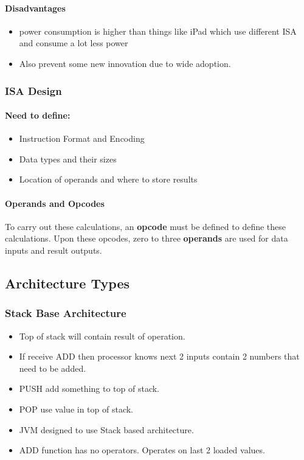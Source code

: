 \documentclass{article}
\newcommand\tab[1][0.5cm]{\hspace*{#1}}
\begin{document}
			\paragraph{\tab Disadvantages}
				\begin{itemize}
					\item power consumption is higher than things like iPad which use different ISA and consume a lot less power
					\item Also prevent some new innovation due to wide adoption.
				\end{itemize}


		\subsubsection*{ISA Design}
			\paragraph{\tab Need to define:}
			\begin{itemize}
				\item Instruction Format and Encoding
				\item Data types and their sizes
				\item Location of operands and where to store results
			\end{itemize}

		\paragraph{\tab Operands and Opcodes} To carry out these calculations, an \textbf{opcode} must be defined to define these calculations. Upon these opcodes, zero to three \textbf{operands} are used for data inputs and result outputs.

	\subsection*{Architecture Types}
		\subsubsection*{Stack Base Architecture}
			\begin{itemize}
				\item Top of stack will contain result of operation.
				\item If receive ADD then processor knows next 2 inputs contain 2 numbers that need to be added.
				\item PUSH add something to top of stack.
				\item POP use value in top of stack.
				\item JVM designed to use Stack based architecture.
				\item ADD function has no operators. Operates on last 2 loaded values.
			\end{itemize}
\end{document}
